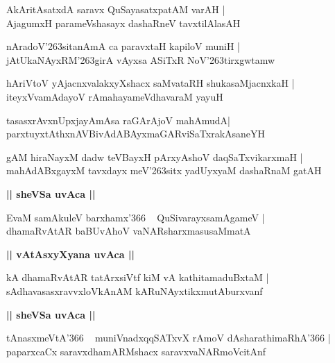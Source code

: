 \documentclass[twoside,12pt,openright]{book}
\def\S{\char'263}
\newcounter{shloka}[chapter]
\def\uvaca#1{\centerline{{\large\textbf{#1}}}}
\begin{document}
\begin{shloka}%
AkAritAsatxdA saravx QuSayasatxpatAM varAH |\\
AjagumxH parameVshasayx dashaRneV tavxtilAlasAH 
\end{shloka}

\begin{shloka}%
nAradoV\S sitanAmA ca paravxtaH kapiloV muniH |\\
jAtUkaNAyxRM\S girA vAyxsa ASiTxR NoV\S tirxgwtamw
\end{shloka}

\begin{shloka}%
hAriVtoV yAjacnxvalakxyXshacx saMvataRH shukasaMjacnxkaH |\\
iteyxVvamAdayoV rAmahayameVdhavaraM yayuH
\end{shloka}

\begin{shloka}%
tasasxrAvxnUpxjayAmAsa raGArAjoV mahAmudA|\\
parxtuyxtAthxnAVBivAdABAyxmaGARviSaTxrakAsaneYH
\end{shloka}

\begin{shloka}%
gAM hiraNayxM dadw teVBayxH pArxyAshoV daqSaTxvikarxmaH |\\
mahAdABxgayxM tavxdayx meV\S sitx yadUyxyaM dashaRnaM gatAH 
\end{shloka}

\uvaca{|| sheVSa uvAca ||}

\begin{shloka}%
EvaM samAkuleV barxhamx\char'366 ~ QuSivarayxsamAgameV |\\
dhamaRvAtAR baBUvAhoV vaNARsharxmasusaMmatA 
\end{shloka}

\uvaca{|| vAtAsxyXyana uvAca ||}

\begin{shloka}%
kA dhamaRvAtAR tatArxsiVtf kiM vA kathitamaduBxtaM |\\
sAdhavasasxravvxloVkAnAM kARuNAyxtikxmutAburxvanf
\end{shloka}

\uvaca{|| sheVSa uvAca ||}

\begin{shloka}%
tAnasxmeVtA\char'366 ~ muniVnadxqqSATxvX rAmoV dAsharathimaRhA\char'366 |\\
paparxcaCx saravxdhamARMshacx saravxvaNARmoVcitAnf 
\end{shloka}
\end{document}
